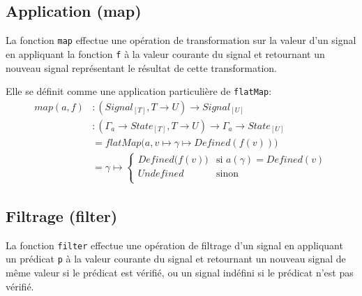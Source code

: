 	\subsection{Application (map)}
	
		\begin{center}
		\end{center}
	
		La fonction \texttt{map} effectue une opération de transformation sur la valeur d'un signal en appliquant la fonction \texttt{f} à la valeur courante du signal et retournant un nouveau signal représentant le résultat de cette transformation.
		
		Elle se définit comme une application particulière de \texttt{flatMap}:
		\begin{align*}
			map(a, f)
				&\colon (Signal_{[T]}, T \to U) \to Signal_{[U]} \\
				&\colon (\Gamma_a \to State_{[T]}, T \to U) \to \Gamma_a \to State_{[U]} \\
				&= flatMap \big( a, v \mapsto \gamma \mapsto Defined(f(v)) \big)\\
				&= \gamma \mapsto \begin{cases}
					Defined \big(f (v) \big) & \text{si } a(\gamma) = Defined(v)\\
					Undefined & \text{sinon}\\
				\end{cases}
		\end{align*}
	
	\subsection{Filtrage (filter)}
	
		\begin{center}
		\end{center}
	
		La fonction \texttt{filter} effectue une opération de filtrage d'un signal en appliquant un prédicat \texttt{p} à la valeur courante du signal et retournant un nouveau signal de même valeur si le prédicat est vérifié, ou un signal indéfini si le prédicat n'est pas vérifié.
		
